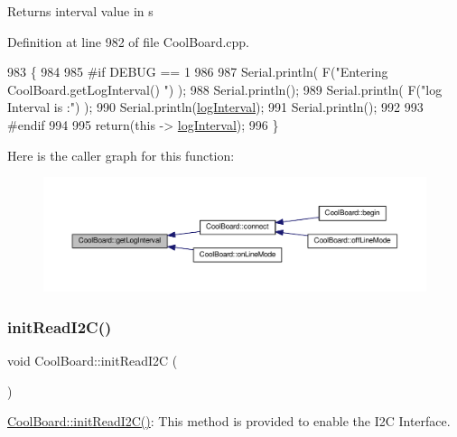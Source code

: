 \begin{DoxyReturn}{Returns}
interval value in s 
\end{DoxyReturn}


Definition at line 982 of file Cool\+Board.\+cpp.


\begin{DoxyCode}
983 \{
984 
985 \textcolor{preprocessor}{#if DEBUG == 1}
986 
987     Serial.println( F(\textcolor{stringliteral}{"Entering CoolBoard.getLogInterval() "}) );
988     Serial.println();
989     Serial.println( F(\textcolor{stringliteral}{"log Interval is :"}) );
990     Serial.println(\hyperlink{class_cool_board_a84bc94413b64973e4aba8c467c97006c}{logInterval});
991     Serial.println();
992 
993 \textcolor{preprocessor}{#endif}
994 
995     \textcolor{keywordflow}{return}(\textcolor{keyword}{this} -> \hyperlink{class_cool_board_a84bc94413b64973e4aba8c467c97006c}{logInterval});
996 \}
\end{DoxyCode}
Here is the caller graph for this function\+:\nopagebreak
\begin{figure}[H]
\begin{center}
\leavevmode
\includegraphics[width=350pt]{d7/df9/class_cool_board_a7508e029f2ee17bb747ffab599285e0d_icgraph}
\end{center}
\end{figure}
\mbox{\label{class_cool_board_a397b46fadab8f530a8cf4d914c561366}} 
\subsubsection{\texorpdfstring{init\+Read\+I2\+C()}{initReadI2C()}}
{\footnotesize\ttfamily void Cool\+Board\+::init\+Read\+I2C (\begin{DoxyParamCaption}{ }\end{DoxyParamCaption})}

\hyperlink{class_cool_board_a397b46fadab8f530a8cf4d914c561366}{Cool\+Board\+::init\+Read\+I2\+C()}\+: This method is provided to enable the I2C Interface. 

